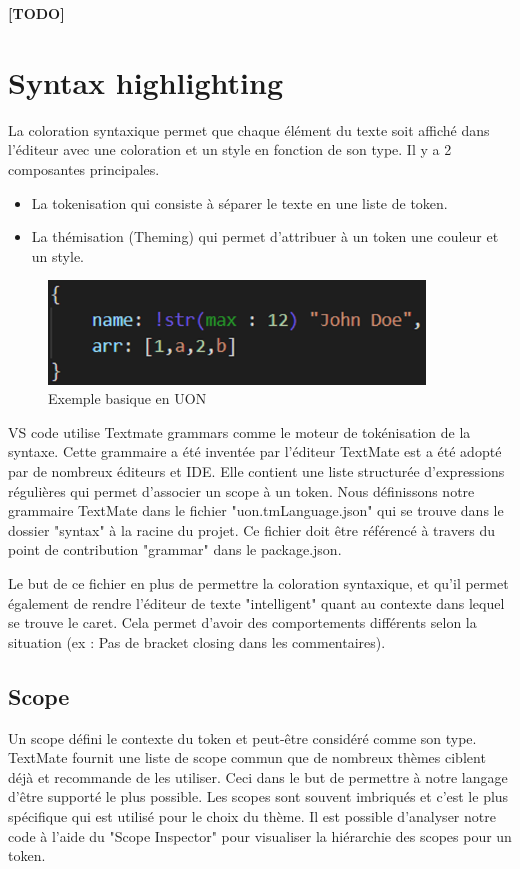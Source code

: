 \documentclass[
    iict, %
    il, %
]{heig-tb}
\begin{document}
\textbf{[TODO]}

\section{Syntax highlighting}
La coloration syntaxique permet que chaque élément du texte soit affiché dans l'éditeur avec une coloration et un style en fonction de son type.
Il y a 2 composantes principales.
\begin{itemize}
    \item La tokenisation qui consiste à séparer le texte en une liste de token.
    \item La thémisation (Theming) qui permet d'attribuer à un token une couleur et un style.
\end{itemize}

\begin{figure}[!h]
    \begin{center}
        \includegraphics[width=10cm]{assets/figures/basic-uon.png}
    \end{center}
    \caption[code UON]{\label{basic-uon} Exemple basique en UON}
\end{figure}


VS code utilise Textmate grammars \cite{textmate-grammars} comme le moteur de tokénisation de la syntaxe.
Cette grammaire a été inventée par l'éditeur TextMate est a été adopté par de nombreux éditeurs et IDE.
Elle contient une liste structurée d'expressions régulières qui permet d'associer un scope à un token.
Nous définissons notre grammaire TextMate dans le fichier "uon.tmLanguage.json" qui  se trouve dans le dossier "syntax" à la racine du projet.
Ce fichier doit être référencé à travers du point de contribution "grammar" dans le package.json.

Le but de ce fichier en plus de permettre la coloration syntaxique, et qu'il permet également de rendre l'éditeur de texte "intelligent" quant au contexte dans lequel se trouve le caret. Cela permet d'avoir des comportements différents selon la situation (ex : Pas de bracket closing dans les commentaires).

\subsection{Scope}
Un scope défini le contexte du token et peut-être considéré comme son type.
TextMate fournit une liste de scope commun que de nombreux thèmes ciblent déjà et recommande de les utiliser. Ceci dans le but de permettre à notre langage d'être supporté le plus possible.
Les scopes sont souvent imbriqués et c'est le plus spécifique qui est utilisé pour le choix du thème.
Il est possible d'analyser notre code à l'aide du "Scope Inspector" pour visualiser la hiérarchie des scopes pour un token.
\end{document}
